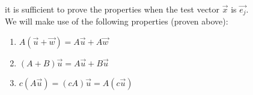 \documentclass{report}
\begin{document}
  it is sufficient to prove the properties when the test vector $ \vec{ x} $ is $ \vec{ e_j} $.\\
  We will make use of the following properties (proven above):\\
          \begin{enumerate}[label=(\roman*)]
            \item $ A \left( \vec{ u} + \vec{ w}  \right) = A \vec{ u} + A \vec{ w} $
            \item     $ \left( A+B \right) \vec{ u} = A \vec{ u} + B \vec{ u} $
            \item $ c \left( A \vec{ u}  \right) = \left( c A \right) \vec{ u} = A \left( c \vec{ u}  \right) $
            \end{enumerate}  \\
            \\
            \\
            
\end{document}
